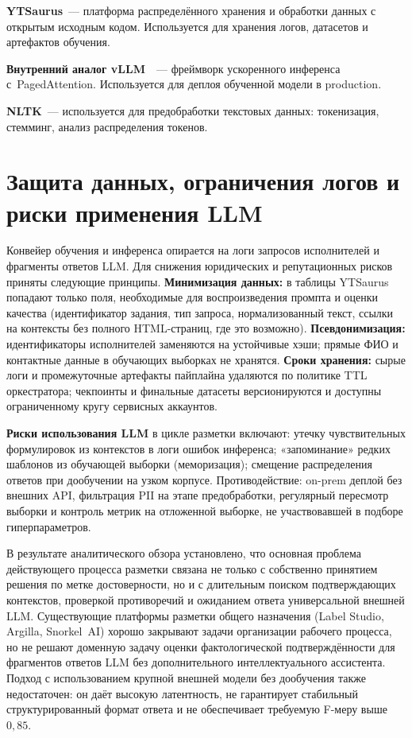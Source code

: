 \documentclass[times]{itmo-student-thesis}
\begin{document}
\textbf{YTSaurus}~--- платформа распределённого хранения и обработки данных
с открытым исходным кодом. Используется для хранения логов, датасетов
и артефактов обучения.

\textbf{Внутренний аналог vLLM}~\cite{kwon2023vllm}~--- фреймворк ускоренного
инференса с~PagedAttention. Используется для деплоя обученной модели
в production.

\textbf{NLTK}~--- используется для предобработки текстовых данных:
токенизация, стемминг, анализ распределения токенов.

\finishrelatedwork

\section{Защита данных, ограничения логов и риски применения LLM}

Конвейер обучения и инференса опирается на логи запросов исполнителей
и фрагменты ответов LLM. Для снижения юридических и репутационных рисков
приняты следующие принципы. \textbf{Минимизация данных:} в таблицы
YTSaurus попадают только поля, необходимые для воспроизведения промпта
и оценки качества (идентификатор задания, тип запроса, нормализованный
текст, ссылки на контексты без полного HTML-страниц, где это возможно).
\textbf{Псевдонимизация:} идентификаторы исполнителей заменяются на
устойчивые хэши; прямые ФИО и контактные данные в обучающих выборках
не хранятся. \textbf{Сроки хранения:} сырые логи и промежуточные
артефакты пайплайна удаляются по политике TTL оркестратора; чекпоинты
и финальные датасеты версионируются и доступны ограниченному кругу
сервисных аккаунтов.

\textbf{Риски использования LLM} в цикле разметки включают: утечку
чувствительных формулировок из контекстов в логи ошибок инференса;
«запоминание» редких шаблонов из обучающей выборки (меморизация);
смещение распределения ответов при дообучении на узком корпусе.
Противодействие: on-prem деплой без внешних API, фильтрация PII
на этапе предобработки, регулярный пересмотр выборки и контроль
метрик на отложенной выборке, не участвовавшей в подборе гиперпараметров.

\chapterconclusion

В результате аналитического обзора установлено, что основная проблема
действующего процесса разметки связана не только с собственно принятием
решения по метке достоверности, но и с длительным поиском подтверждающих
контекстов, проверкой противоречий и ожиданием ответа универсальной внешней
LLM. Существующие платформы разметки общего назначения (Label Studio,
Argilla, Snorkel~AI) хорошо закрывают задачи организации рабочего процесса,
но не решают доменную задачу оценки фактологической подтверждённости
для фрагментов ответов LLM без
дополнительного интеллектуального ассистента. Подход с использованием
крупной внешней модели без дообучения также недостаточен: он даёт высокую
латентность, не гарантирует стабильный структурированный формат ответа и
не обеспечивает требуемую F-меру выше~$0{,}85$.
\end{document}

